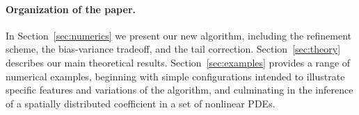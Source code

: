 \paragraph{Organization of the paper.} In Section~\ref{sec:numerics} we present our new algorithm, including the refinement scheme, the bias-variance tradeoff, and the tail correction. Section~\ref{sec:theory} describes our main theoretical results. Section~\ref{sec:examples} provides a range of numerical examples, beginning with simple configurations intended to illustrate specific features and variations of the algorithm, and culminating in the inference of a spatially distributed coefficient in a set of nonlinear PDEs.
